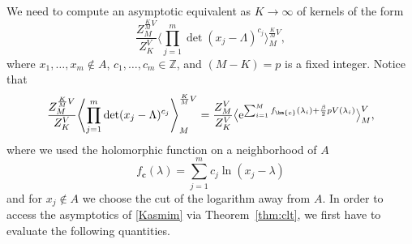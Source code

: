 \documentclass[pdftex]{sigma}
\numberwithin{equation}{section}
\begin{document}
We need to compute an asymptotic equivalent as $K \rightarrow \infty$ of kernels of the form
\begin{equation*}
 \frac{Z_{M}^{\frac{K}{M}V}}{Z_K^V} \Biggl\langle\prod_{j=1}^{m}\det(x_{j} - \Lambda)^{c_{j}}\Biggr\rangle^{\frac{K}{M}V}_{M},
\end{equation*}
where $x_{1}, \ldots, x_{m} \notin A$, $c_{1}, \ldots, c_{m} \in \mathbb{Z}$, and $(M - K) = p$ is a fixed integer. Notice that
\begin{equation}
 \label{Kasmim}
 \frac{Z_{M}^{\frac{K}{M}V}}{Z_K^V}\Biggl\langle\prod_{j=1}^{m}\det(x_{j} - \Lambda)^{c_{j}}\Biggr\rangle^{\frac{K}{M}V}_{M} = \frac{Z_M^{V}}{Z_K^{V}} \bigl\langle{\rm e}^{\sum_{i=1}^{M} f_{\bm{c}}(\lambda_{i}) + \frac{\beta}{2}pV(\lambda_i)}\bigr\rangle^{V}_{M},
\end{equation}
where we used the holomorphic function on a neighborhood of $A$
\begin{equation*}
 f_{\bm{c}}(\lambda) = \sum_{j=1}^{m}c_{j}\ln(x_{j} - \lambda)
\end{equation*}
and for $x_j \notin A$ we choose the cut of the logarithm away from $A$. In order to access the asymptotics of \eqref{Kasmim} via Theorem~\ref{thm:clt}, we first have to evaluate the following quantities.
\end{document}
